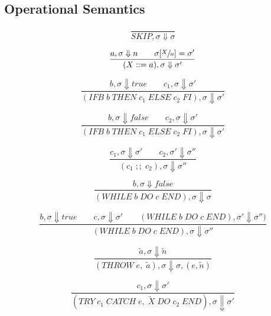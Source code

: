 \subsection{Operational Semantics}

\begin{equation}
\frac{}{SKIP, \sigma \Downarrow \sigma}
\end{equation}

\begin{equation}
\frac{a, \sigma \Downarrow n \qquad \sigma[\sfrac{X}{n}] = \sigma'}{(X ::= a), \sigma \Downarrow \sigma'}
\end{equation}

\begin{equation}
\frac{b, \sigma \Downarrow true \qquad c_1, \sigma \Downarrow \sigma'}{(IFB\; b\; THEN\; c_1\; ELSE\; c_2\; FI), \sigma \Downarrow \sigma'}
\end{equation}

\begin{equation}
\frac{b, \sigma \Downarrow false \qquad c_2, \sigma \Downarrow \sigma'}{(IFB\; b\; THEN\; c_1\; ELSE\; c_2\; FI), \sigma \Downarrow \sigma'}
\end{equation}

\begin{equation}
\frac{c_1, \sigma \Downarrow \sigma' \qquad c_2, \sigma' \Downarrow \sigma''}{(c_1\; ;;\; c_2), \sigma \Downarrow \sigma''}
\end{equation}

\begin{equation}
\frac{b, \sigma \Downarrow false}{(WHILE\; b\; DO\; c\; END), \sigma \Downarrow \sigma}
\end{equation}

\begin{equation}
\frac{b, \sigma \Downarrow true \qquad c, \sigma \Downarrow \sigma' \qquad (WHILE\; b\; DO\; c\; END), \sigma' \Downarrow \sigma'')}{(WHILE\; b\; DO\; c\; END), \sigma \Downarrow \sigma''}
\end{equation}

\begin{equation}
\frac{\tilde{a}, \sigma \Downarrow \tilde{n}}{(THROW\; e,\; \tilde{a}), \sigma \Downarrow \sigma, (e, \tilde{n})}
\end{equation}

\begin{equation}
\frac{c_1, \sigma \Downarrow \sigma'}{(TRY\; c_1\; CATCH\; e,\; \tilde{X}\; DO\; c_2\; END), \sigma \Downarrow \sigma'}
\end{equation}

